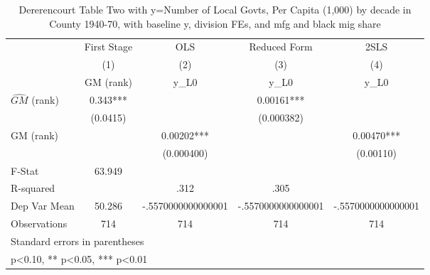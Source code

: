\begin{table}[htbp]\centering
\def\sym#1{\ifmmode^{#1}\else\(^{#1}\)\fi}
\caption{Dererencourt Table Two with y=Number of Local Govts, Per Capita (1,000) by decade in County 1940-70, with baseline y, division FEs, and mfg and black mig share}
\begin{tabular}{l*{4}{c}}
\toprule
                    & First Stage   &         OLS   &Reduced Form   &        2SLS   \\
                    &\multicolumn{1}{c}{(1)}&\multicolumn{1}{c}{(2)}&\multicolumn{1}{c}{(3)}&\multicolumn{1}{c}{(4)}\\
                    &\multicolumn{1}{c}{GM  (rank)}&\multicolumn{1}{c}{y\_L0}&\multicolumn{1}{c}{y\_L0}&\multicolumn{1}{c}{y\_L0}\\
\midrule
$\hat{GM}$ (rank)   &       0.343***&               &     0.00161***&               \\
                    &    (0.0415)   &               &  (0.000382)   &               \\
\addlinespace
GM  (rank)          &               &     0.00202***&               &     0.00470***\\
                    &               &  (0.000400)   &               &   (0.00110)   \\
\midrule
F-Stat              &      63.949   &               &               &               \\
R-squared           &               &        .312   &        .305   &               \\
Dep Var Mean        &      50.286   &-.5570000000000001   &-.5570000000000001   &-.5570000000000001   \\
Observations        &         714   &         714   &         714   &         714   \\
\bottomrule
\multicolumn{5}{l}{\footnotesize Standard errors in parentheses}\\
\multicolumn{5}{l}{\footnotesize * p<0.10, ** p<0.05, *** p<0.01}\\
\end{tabular}
\end{table}
